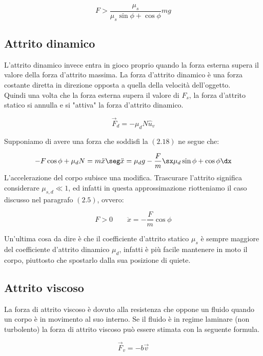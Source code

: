 \begin{equation}
F > \frac{\mu_s}{\mu_s\sin\phi+\cos\phi}mg
\end{equation}


\subsection{Attrito dinamico}
L'attrito dinamico invece entra in gioco proprio quando la forza esterna supera il valore della forza d'attrito massima. La forza d'attrito dinamico è una forza costante diretta in direzione opposta a quella della velocità dell'oggetto.\\ Quindi una volta che la forza esterna supera il valore di $F_s$, la forza d'attrito statico si annulla e si "attiva" la forza d'attrito dinamico.


\begin{equation}
\vec F_d = -\mu_dN\hat u_v
\end{equation}

Supponiamo di avere una forza che soddisfi la $(2.18)$ ne segue che:

\begin{equation}
-F\cos\phi + \mu_dN = m\ddot x \seg \ddot x = \mu_dg-\frac Fm\sx\mu_d\sin\phi + \cos\phi\dx
\end{equation}
 L'accelerazione del corpo subisce una modifica. Trascurare l'attrito significa considerare $\mu_{s,d}\ll 1$, ed infatti in questa approssimazione riotteniamo il caso discusso nel paragrafo $(2.5)$, ovvero:
 
\begin{equation}
F>0\quad\quad \ddot x = -\frac Fm\cos\phi
\end{equation}

Un'ultima cosa da dire è che il coefficiente d'attrito statico $\mu_s$ è sempre maggiore del coefficiente d'attrito dinamico $\mu_d$, infatti è più facile mantenere in moto il corpo, piuttosto che spostarlo dalla sua posizione di quiete.


\subsection{Attrito viscoso}
La forza di attrito viscoso è dovuto alla resistenza che oppone un fluido quando un corpo è in movimento al suo interno. Se il fluido è in regime laminare (non turbolento) la forza di attrito viscoso può essere stimata con la seguente formula.


\begin{equation}
\vec F_v = -b\vec v
\end{equation}

